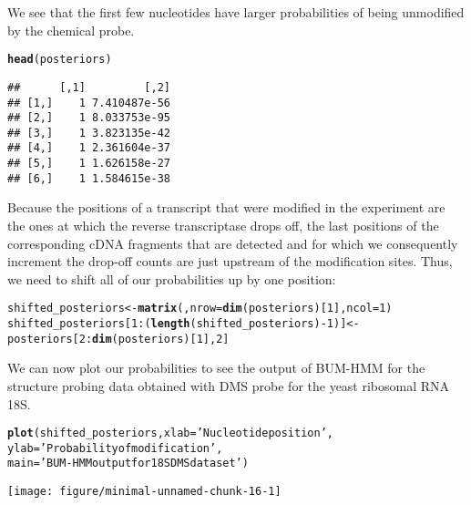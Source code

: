 \documentclass{article}\usepackage[]{graphicx}\usepackage[]{color}
\makeatletter
\def\maxwidth{ %
  \ifdim\Gin@nat@width>\linewidth
    \linewidth
  \else
    \Gin@nat@width
  \fi
}
\newcommand{\hlnum}[1]{\textcolor[rgb]{0.686,0.059,0.569}{#1}}%
\newcommand{\hlstr}[1]{\textcolor[rgb]{0.192,0.494,0.8}{#1}}%
\newcommand{\hlopt}[1]{\textcolor[rgb]{0,0,0}{#1}}%
\newcommand{\hlstd}[1]{\textcolor[rgb]{0.345,0.345,0.345}{#1}}%
\newcommand{\hlkwb}[1]{\textcolor[rgb]{0.69,0.353,0.396}{#1}}%
\newcommand{\hlkwc}[1]{\textcolor[rgb]{0.333,0.667,0.333}{#1}}%
\newcommand{\hlkwd}[1]{\textcolor[rgb]{0.737,0.353,0.396}{\textbf{#1}}}%
\newenvironment{kframe}{%
 \def\at@end@of@kframe{}%
 \ifinner\ifhmode%
  \def\at@end@of@kframe{\end{minipage}}%
  \begin{minipage}{\columnwidth}%
 \fi\fi%
 \def\FrameCommand##1{\hskip\@totalleftmargin \hskip-\fboxsep
 \colorbox{shadecolor}{##1}\hskip-\fboxsep
     \hskip-\linewidth \hskip-\@totalleftmargin \hskip\columnwidth}%
 \MakeFramed {\advance\hsize-\width
   \@totalleftmargin\z@ \linewidth\hsize
   \@setminipage}}%
 {\par\unskip\endMakeFramed%
 \at@end@of@kframe}
\newenvironment{knitrout}{}{} %
\makeatother
\begin{document}
We see that the first few nucleotides have larger probabilities of
being unmodified by the chemical probe.

\begin{knitrout}
\color{fgcolor}\begin{kframe}
\begin{alltt}
\hlkwd{head}\hlstd{(posteriors)}
\end{alltt}
\begin{verbatim}
##      [,1]         [,2]
## [1,]    1 7.410487e-56
## [2,]    1 8.033753e-95
## [3,]    1 3.823135e-42
## [4,]    1 2.361604e-37
## [5,]    1 1.626158e-27
## [6,]    1 1.584615e-38
\end{verbatim}
\end{kframe}
\end{knitrout}

Because the positions of a transcript that were modified in the experiment are
the ones at which the reverse transcriptase drops off, the last positions of the
corresponding cDNA fragments that are detected and for which we consequently
increment the drop-off counts are just upstream of the modification sites. Thus,
we need to shift all of our probabilities up by one position:

\begin{knitrout}
\color{fgcolor}\begin{kframe}
\begin{alltt}
\hlstd{shifted_posteriors} \hlkwb{<-} \hlkwd{matrix}\hlstd{(,} \hlkwc{nrow}\hlstd{=}\hlkwd{dim}\hlstd{(posteriors)[}\hlnum{1}\hlstd{],} \hlkwc{ncol}\hlstd{=}\hlnum{1}\hlstd{)}
\hlstd{shifted_posteriors[}\hlnum{1}\hlopt{:}\hlstd{(}\hlkwd{length}\hlstd{(shifted_posteriors)} \hlopt{-} \hlnum{1}\hlstd{)]} \hlkwb{<-}
                  \hlstd{posteriors[}\hlnum{2}\hlopt{:}\hlkwd{dim}\hlstd{(posteriors)[}\hlnum{1}\hlstd{],} \hlnum{2}\hlstd{]}
\end{alltt}
\end{kframe}
\end{knitrout}

We can now plot our probabilities to see the output of BUM-HMM for the structure
probing data obtained with DMS probe for the yeast ribosomal RNA 18S.

\begin{knitrout}
\color{fgcolor}\begin{kframe}
\begin{alltt}
\hlkwd{plot}\hlstd{(shifted_posteriors,} \hlkwc{xlab} \hlstd{=} \hlstr{'Nucleotide position'}\hlstd{,}
     \hlkwc{ylab} \hlstd{=} \hlstr{'Probability of modification'}\hlstd{,}
     \hlkwc{main} \hlstd{=} \hlstr{'BUM-HMM output for 18S DMS data set'}\hlstd{)}
\end{alltt}
\end{kframe}

{\centering \texttt{[image: figure/minimal-unnamed-chunk-16-1]} 

}



\end{knitrout}
\end{document}
